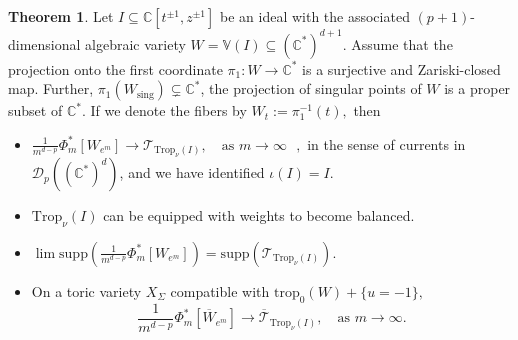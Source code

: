 \documentclass[11pt]{amsart}
\theoremstyle{definition}
\newtheorem{theorem}{Theorem}[section]
\newcommand{\lto}{\longrightarrow}
\newcommand{\C}{\mathbb{C}}
\newcommand{\trop}{\mathrm{trop}}
\newcommand{\sD}{\mathscr{D}}
\newcommand{\sT}{\mathscr{T}}
\newcommand{\Trop}{\mathrm{Trop}}
\newcommand{\supp}[1]{{\mathrm{supp}(#1)}}
\begin{document}
\begin{theorem}\label{thm:dyn-trop-nont}
    Let $I \subseteq \C[t^{\pm 1}, z^{\pm 1}]$ be an ideal with the associated $(p+1)$-dimensional algebraic variety $W= \mathbb{V}(I) \subseteq (\C^*)^{d+1}.$ Assume that the projection onto the first coordinate $\pi_1: W \lto \C^*$ is a surjective and Zariski-closed map. Further,  $\pi_1(W_{\text{sing}}) \subsetneq \C^*$, the projection of singular points of $W$ is a proper subset of $\C^*$. If we denote the fibers by $W_{t} := \pi_1^{-1}(t),$ then
    \begin{itemize}
        \item [(a)]  $\frac{1}{m^{d-p}}\Phi_m^* [W_{e^m}] \lto \sT_{\Trop_{\nu}(I)}, \quad \text{as $m \to \infty$ },$ in the sense of currents in $\sD_{p}((\C^*)^d)$, and we have identified $\iota(I)= I.$
    
    \item [(b)]  $\Trop_{\nu}(I)$ can be equipped with weights to become balanced.
    \item [(c)] $\lim \supp{\frac{1}{m^{d-p}}\Phi_m^* [W_{e^m}]} = \supp{\sT_{\Trop_{\nu}(I)}}.$
    \item [(d)] On a toric variety $X_{\Sigma}$ compatible with $\trop_0(W)+ \{u=-1 \},$
    $$
    \frac{1}{m^{d-p}}\Phi_m^* [\overline{W}_{e^m}] \lto \overline{\sT}_{\Trop_{\nu}(I)}, \quad \text{as $m \to \infty$.}
    $$
    \end{itemize}
\end{theorem}
\end{document}
